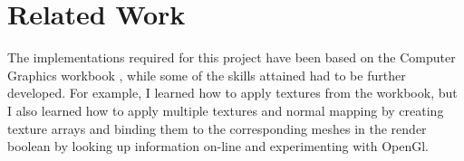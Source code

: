\documentclass[10pt, a4paper]{article}
\begin{document}
    
	
	\section{Related Work}

	
	The implementations required for this project have been based on the Computer Graphics workbook \cite{Workbook}, while some of the skills attained had to be further developed. For example, I learned how to apply textures from the workbook, but I also learned how to apply multiple textures and normal mapping by creating texture arrays and binding them to the corresponding meshes in the render boolean by looking up information on-line and experimenting with OpenGl.
	

	
	

	
	
\end{document}
